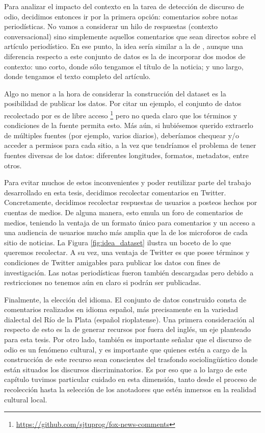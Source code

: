 Para analizar el impacto del contexto en la tarea de detección de discurso de odio, decidimos entonces ir por la primera opción: comentarios sobre notas periodísticas. No vamos a considerar un hilo de respuestas (contexto conversacional) sino simplemente aquellos comentarios que sean directos sobre el artículo periodístico. En ese punto, la idea sería similar a la de \citet{gao-huang-2017-detecting}, aunque una diferencia respecto a este conjunto de datos es la de incorporar dos modos de contexto: uno corto, donde sólo tengamos el título de la noticia; y uno largo, donde tengamos el texto completo del artículo.

Algo no menor a la hora de considerar la construcción del dataset es la posibilidad de publicar los datos. Por citar un ejemplo, el conjunto de datos recolectado por \citet{gao-huang-2017-detecting} es de libre acceso \footnote{\url{https://github.com/sjtuprog/fox-news-comments}} pero no queda claro que los términos y condiciones de la fuente permita esto. Más aún, si hubiésemos querido extraerlo de múltiples fuentes (por ejemplo, varios diarios), deberíamos chequear y/o acceder a permisos para cada sitio, a la vez que tendríamos el problema de tener fuentes diversas de los datos: diferentes longitudes, formatos, metadatos, entre otros.

Para evitar muchos de estos inconvenientes y poder reutilizar parte del trabajo desarrollado en esta tesis, decidimos recolectar comentarios en Twitter. Concretamente, decidimos recolectar respuestas de usuarios a posteos hechos por cuentas de medios. De alguna manera, esto emula un foro de comentarios de medios, teniendo la ventaja de un formato único para comentarios y un acceso a una audiencia de usuarios mucho más amplia que la de los microforos de cada sitio de noticias. La Figura \ref{fig:idea_dataset} ilustra un boceto de lo que queremos recolectar. A su vez, una ventaja de Twitter es que posee términos y condiciones de Twitter amigables para publicar los datos con fines de investigación. Las notas periodísticas fueron también descargadas pero debido a restricciones no tenemos aún en claro si podrán ser publicadas.

Finalmente, la elección del idioma. El conjunto de datos construido consta de comentarios realizados en idioma español, más precisamente en la variedad dialectal del Río de la Plata (español rioplatense). Una primera consideración al respecto de esto es la de generar recursos por fuera del inglés, un eje planteado para esta tesis. Por otro lado, también es importante señalar que el discurso de odio es un fenómeno cultural, y es importante que quienes estén a cargo de la construcción de este recurso sean conscientes del trasfondo sociolingüístico donde están situados los discursos discriminatorios. Es por eso que a lo largo de este capítulo tuvimos particular cuidado en esta dimensión, tanto desde el proceso de recolección hasta la selección de los anotadores que estén inmersos en la realidad cultural local.


